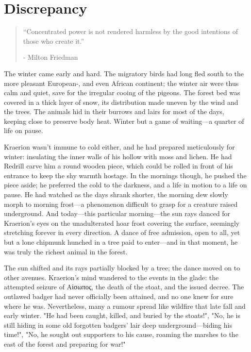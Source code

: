 \chapter{Discrepancy}

\vspace{-1.3cm}
\begin{localsize}{10}
	\begin{quote}
	“Concentrated power is not rendered harmless by the good intentions of those who create it.” 
		\begin{flushright}- Milton Friedman \end{flushright}
	\end{quote} 
\end{localsize}
\vspace{1cm}

The winter came early and hard. The migratory birds had long fled south to the more pleasant European-, and even African continent; the winter air were thus calm and quiet, save for the irregular cooing of the pigeons. The forest bed was covered in a thick layer of snow, its distribution made uneven by the wind and the trees. The animals hid in their burrows and lairs for most of the days, keeping close to preserve body heat. Winter but a game of waiting---a quarter of life on pause.

Kraerion wasn't immune to cold either, and he had prepared meticulously for winter: insulating the inner walls of his hollow with moss and lichen. He had Redrill carve him a round wooden piece, which could be rolled in front of his entrance to keep the shy warmth hostage. In the mornings though, he pushed the piece aside; he preferred the cold to the darkness, and a life in motion to a life on pause. He had watched as the days shrank shorter, the morning dew slowly morph to morning frost---a phenomenon difficult to grasp for a creature raised underground. And today---this particular morning---the sun rays danced for Kraerion's eyes on the unadulterated hoar frost covering the surface, seemingly stretching forever  in every direction. A dance of free admission, open to all, yet but a lone chipmunk hunched in a tree paid to enter---and in that moment, he was truly the richest animal in the forest.

The sun shifted and its rays partially blocked by a tree; the dance moved on to other avenues. Kraerion's mind wandered to the events in the glade: the attempted seizure of Αίσωπος, the death of the stoat, and the issued decree. The outlawed badger had never officially been attained, and no one knew for sure where he was. Nevertheless, many a rumour spread like wildfire that late fall and early winter. "He had been caught, killed, and buried by the stoats!", "No, he is still hiding in some old forgotten badgers' lair deep underground---biding his time!", "No, he sought out supporters to his cause, roaming the marshes to the east of the forest and preparing for war!" %

